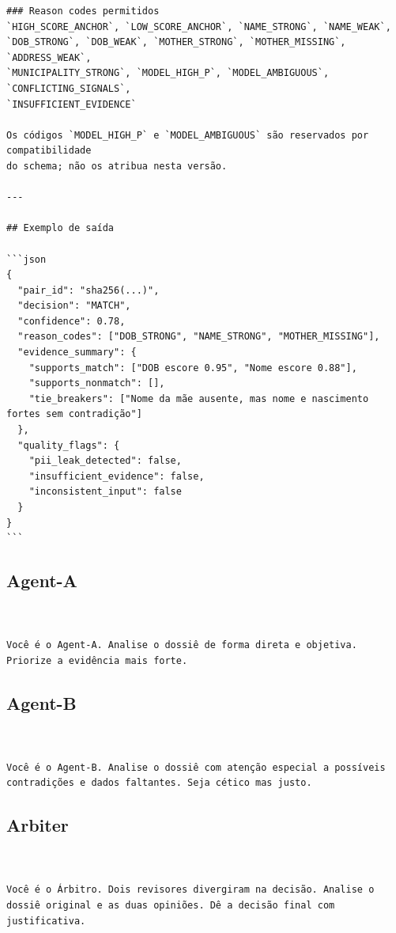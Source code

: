 {\begin{verbatim}
### Reason codes permitidos
`HIGH_SCORE_ANCHOR`, `LOW_SCORE_ANCHOR`, `NAME_STRONG`, `NAME_WEAK`,
`DOB_STRONG`, `DOB_WEAK`, `MOTHER_STRONG`, `MOTHER_MISSING`, `ADDRESS_WEAK`,
`MUNICIPALITY_STRONG`, `MODEL_HIGH_P`, `MODEL_AMBIGUOUS`, `CONFLICTING_SIGNALS`,
`INSUFFICIENT_EVIDENCE`

Os códigos `MODEL_HIGH_P` e `MODEL_AMBIGUOUS` são reservados por compatibilidade
do schema; não os atribua nesta versão.

---

## Exemplo de saída

```json
{
  "pair_id": "sha256(...)",
  "decision": "MATCH",
  "confidence": 0.78,
  "reason_codes": ["DOB_STRONG", "NAME_STRONG", "MOTHER_MISSING"],
  "evidence_summary": {
    "supports_match": ["DOB escore 0.95", "Nome escore 0.88"],
    "supports_nonmatch": [],
    "tie_breakers": ["Nome da mãe ausente, mas nome e nascimento fortes sem contradição"]
  },
  "quality_flags": {
    "pii_leak_detected": false,
    "insufficient_evidence": false,
    "inconsistent_input": false
  }
}
```
\end{verbatim}
}

\subsection*{Agent-A}

{\fontsize{4.5}{6}\selectfont
\begin{verbatim}


Você é o Agent-A. Analise o dossiê de forma direta e objetiva. Priorize a evidência mais forte.
\end{verbatim}
}

\subsection*{Agent-B}

{\fontsize{4.5}{6}\selectfont
\begin{verbatim}


Você é o Agent-B. Analise o dossiê com atenção especial a possíveis contradições e dados faltantes. Seja cético mas justo.
\end{verbatim}
}

\subsection*{Arbiter}

{\fontsize{4.5}{6}\selectfont
\begin{verbatim}


Você é o Árbitro. Dois revisores divergiram na decisão. Analise o dossiê original e as duas opiniões. Dê a decisão final com justificativa.
\end{verbatim}
}

